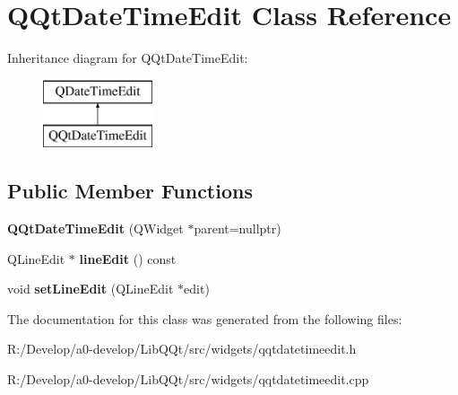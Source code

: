 \hypertarget{class_q_qt_date_time_edit}{}\section{Q\+Qt\+Date\+Time\+Edit Class Reference}
\label{class_q_qt_date_time_edit}
Inheritance diagram for Q\+Qt\+Date\+Time\+Edit\+:\begin{figure}[H]
\begin{center}
\leavevmode
\includegraphics[height=2.000000cm]{class_q_qt_date_time_edit}
\end{center}
\end{figure}
\subsection*{Public Member Functions}
\begin{DoxyCompactItemize}
\item 
\mbox{\label{class_q_qt_date_time_edit_a8a69d5458d367cdf07f02e842295ab7e}} 
{\bfseries Q\+Qt\+Date\+Time\+Edit} (Q\+Widget $\ast$parent=nullptr)
\item 
\mbox{\label{class_q_qt_date_time_edit_abc7c39fa44e44d3ef14000b9635a3bd8}} 
Q\+Line\+Edit $\ast$ {\bfseries line\+Edit} () const
\item 
\mbox{\label{class_q_qt_date_time_edit_add2150522ff911f0814ba1d9dd0059af}} 
void {\bfseries set\+Line\+Edit} (Q\+Line\+Edit $\ast$edit)
\end{DoxyCompactItemize}


The documentation for this class was generated from the following files\+:\begin{DoxyCompactItemize}
\item 
R\+:/\+Develop/a0-\/develop/\+Lib\+Q\+Qt/src/widgets/qqtdatetimeedit.\+h\item 
R\+:/\+Develop/a0-\/develop/\+Lib\+Q\+Qt/src/widgets/qqtdatetimeedit.\+cpp\end{DoxyCompactItemize}
